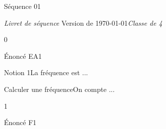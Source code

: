 \documentclass[a4paper,11pt]{article}
\providecommand{\acompleter}[1]{\;\underline{\phantom{#1}}\;}
\begin{document}
\providecommand{\theHExoNum}{\theExoNum}
\providecommand{\theHNotionNum}{\theNotionNum}
\providecommand{\theHMethodeNum}{\theMethodeNum}

\renewcommand{\acompleter}[1]{#1}

\seqCreeCompteurs
{}
\seqInitCorriges
\seqInitAnnexes
\seqInitRemediation

\begin{boiteTitreGen}{Séquence 01}
  \begin{minipage}[c][100pt][c]{\linewidth}
    \vfill \textit{Livret de séquence} \hfill
    \vfill {}
    \vfill Version de \datemoisannee\today \hfill \textit{Classe de 4\ieme}
  \end{minipage}
\end{boiteTitreGen}


\clearpage
\begin{seqSerieExos}{0}
\begin{seqExercice}[nom={EA1}]
Énoncé EA1
\end{seqExercice}
\end{seqSerieExos}

\clearpage
{}

\begin{seqNotion}{Notion 1}{La fréquence est ...}
\end{seqNotion}

\clearpage
{}

\begin{seqMethode}{Calculer une fréquence}{On compte ...}
\end{seqMethode}

\clearpage
\begin{seqSerieExos}{1}
\begin{seqExercice}[nom={F1},obj={02},remediation=oui]
Énoncé F1
\end{seqExercice}
\end{seqSerieExos}
\end{document}

